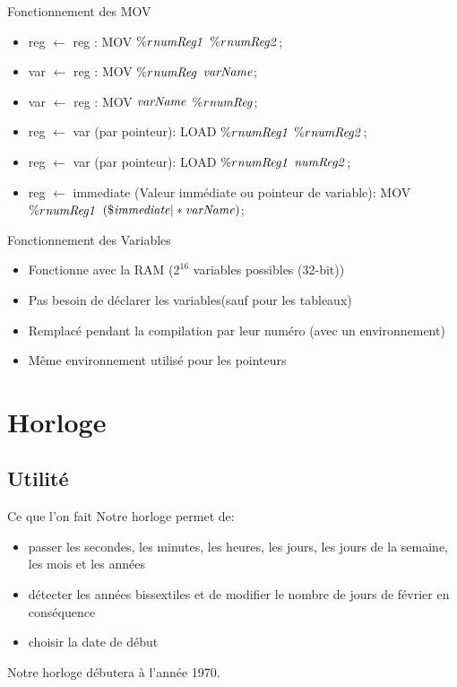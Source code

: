 \documentclass{beamer}
\begin{document}
\begin{frame}{Fonctionnement des MOV}
  \begin{itemize}
    \item reg $\gets$ reg : MOV $\%r\it{numReg1}$ $\%r\it{numReg2}$;
    \item var $\gets$ reg : MOV $\%r\it{numReg}$ $\it{varName}$;
    \item var $\gets$ reg : MOV $\it{varName}$ $\it{\%r\it{numReg}}$;
    \item reg $\gets$ var (par pointeur): LOAD $\%r\it{numReg1}$ $\%r\it{numReg2}$;
    \item reg $\gets$ var (par pointeur): LOAD $\%r\it{numReg1}$ $\it{numReg2}$;
    \item reg $\gets$ immediate (Valeur immédiate ou pointeur de variable): MOV $\%r\it{numReg1}$ $(\$\it{immediate}|*\it{varName})$;
  \end{itemize}
\end{frame}
\begin{frame}{Fonctionnement des Variables}
  \begin{itemize}
      \item Fonctionne avec la RAM ($2^{16}$ variables possibles (32-bit))
      \item Pas besoin de déclarer les variables(sauf pour les tableaux)
      \item Remplacé pendant la compilation par leur numéro (avec un environnement)
      \item Même environnement utilisé pour les pointeurs
  \end{itemize}
\end{frame}


\section{Horloge}
    \begin{frame}
    \end{frame}

\subsection{Utilité}

\begin{frame}{Ce que l'on fait}
    Notre horloge permet de:
    \begin{itemize}
        \item passer les secondes, les minutes, les heures, les jours, les jours de la semaine, les mois et les années
        \item détecter les années bissextiles et de modifier le nombre de jours de février en conséquence
        \item choisir la date de début
    \end{itemize}

    Notre horloge débutera à l'année 1970.
\end{frame}
\end{document}
